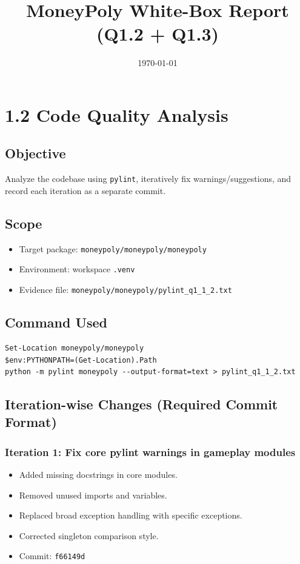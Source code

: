 \documentclass[11pt,a4paper]{article}
\title{MoneyPoly White-Box Report (Q1.2 + Q1.3)}
\author{}
\date{\today}
\begin{document}
\maketitle

\section*{1.2 Code Quality Analysis}

\subsection*{Objective}
Analyze the codebase using \texttt{pylint}, iteratively fix warnings/suggestions, and record each iteration as a separate commit.

\subsection*{Scope}
\begin{itemize}
  \item Target package: \texttt{moneypoly/moneypoly/moneypoly}
  \item Environment: workspace \texttt{.venv}
  \item Evidence file: \texttt{moneypoly/moneypoly/pylint\_q1\_1\_2.txt}
\end{itemize}

\subsection*{Command Used}
\begin{verbatim}
Set-Location moneypoly/moneypoly
$env:PYTHONPATH=(Get-Location).Path
python -m pylint moneypoly --output-format=text > pylint_q1_1_2.txt
\end{verbatim}

\subsection*{Iteration-wise Changes (Required Commit Format)}

\subsubsection*{Iteration 1: Fix core pylint warnings in gameplay modules}
\begin{itemize}
  \item Added missing docstrings in core modules.
  \item Removed unused imports and variables.
  \item Replaced broad exception handling with specific exceptions.
  \item Corrected singleton comparison style.
  \item Commit: \texttt{f66149d}
\end{itemize}
\end{document}
